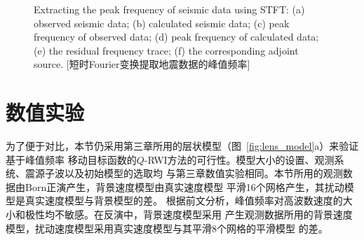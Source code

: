 \begin{figure}[!htbp]
	{Extracting the peak frequency of seismic data using STFT: (a) observed seismic data; 
	(b) calculated seismic data; (c) peak frequency of observed data; (d) peak frequency of 
	calculated data; (e) the residual frequency trace; (f) the corresponding adjoint source.}
    [短时Fourier变换提取地震数据的峰值频率]
    \label{fig:peak_frequency}
\end{figure}

\newpage
\section{数值实验}

为了便于对比，本节仍采用第三章所用的层状模型（图~\ref{fig:lens_model}a）来验证基于峰值频率
移动目标函数的$Q$-RWI方法的可行性。模型大小的设置、观测系统、震源子波以及初始模型的选取均
与第三章数值实验相同。本节所用的观测数据由Born正演产生，背景速度模型由真实速度模型
平滑16个网格产生，其扰动模型是真实速度模型与背景模型的差。
根据前文分析，峰值频率对高波数速度的大小和极性均不敏感。在反演中，背景速度模型采用
产生观测数据所用的背景速度模型，扰动速度模型采用真实速度模型与其平滑8个网格的平滑模型
的差。

